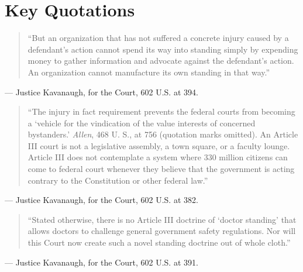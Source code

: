 \documentclass[12pt]{article}
\begin{document}
\section{Key Quotations}

\begin{quote}
``But an organization that has not suffered a concrete injury caused by a defendant's action cannot spend its way into standing simply by expending money to gather information and advocate against the defendant's action. An organization cannot manufacture its own standing in that way.''
\end{quote}
\noindent --- Justice Kavanaugh, for the Court, 602 U.S. at 394.

\begin{quote}
``The injury in fact requirement prevents the federal courts from becoming a `vehicle for the vindication of the value interests of concerned bystanders.' \textit{Allen}, 468 U. S., at 756 (quotation marks omitted). An Article III court is not a legislative assembly, a town square, or a faculty lounge. Article III does not contemplate a system where 330 million citizens can come to federal court whenever they believe that the government is acting contrary to the Constitution or other federal law.''
\end{quote}
\noindent --- Justice Kavanaugh, for the Court, 602 U.S. at 382.

\begin{quote}
``Stated otherwise, there is no Article III doctrine of `doctor standing' that allows doctors to challenge general government safety regulations. Nor will this Court now create such a novel standing doctrine out of whole cloth.''
\end{quote}
\noindent --- Justice Kavanaugh, for the Court, 602 U.S. at 391.
\end{document}
